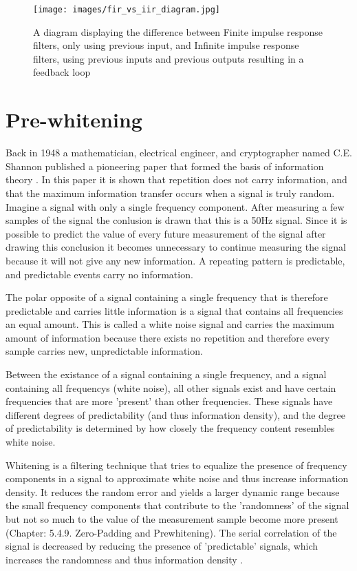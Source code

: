 \begin{figure}[h!t]
	\begin{center}
		\texttt{[image: images/fir\_vs\_iir\_diagram.jpg]}
	\end{center}
	\caption{A diagram displaying the difference between Finite impulse response filters, only using previous input, and Infinite impulse response filters, using previous inputs and previous outputs resulting in a feedback loop \cite{fir_vs_iir_diagram}}
	\label{fig:fir_vs_iir_diagram}
\end{figure}


\section{Pre-whitening}
Back in 1948 a mathematician, electrical engineer, and cryptographer named C.E. Shannon published a pioneering paper that formed the basis of information theory \cite{shannon}. In this paper it is shown that repetition does not carry information, and that the maximum information transfer occurs when a signal is truly random. Imagine a signal with only a single frequency component. After measuring a few samples of the signal the conlusion is drawn that this is a 50Hz signal. Since it is possible to predict the value of every future measurement of the signal after drawing this conclusion it becomes unnecessary to continue measuring the signal because it will not give any new information. A repeating pattern is predictable, and predictable events carry no information.

The polar opposite of a signal containing a single frequency that is therefore predictable and carries little information is a signal that contains all frequencies an equal amount. This is called a white noise signal and carries the maximum amount of information because there exists no repetition and therefore every sample carries new, unpredictable information.

Between the existance of a signal containing a single frequency, and a signal containing all frequencys (white noise), all other signals exist and have certain frequencies that are more 'present' than other frequencies. These signals have different degrees of predictability (and thus information density), and the degree of predictability is determined by how closely the frequency content resembles white noise.

Whitening is a filtering technique that tries to equalize the presence of frequency components in a signal to approximate white noise and thus increase information density. It reduces the random error and yields a larger dynamic range because the small frequency components that contribute to the 'randomness' of the signal but not so much to the value of the measurement sample become more present \cite{time_series_analysis_methods} (Chapter: 5.4.9. Zero-Padding and Prewhitening). The serial correlation of the signal is decreased by reducing the presence of 'predictable' signals, which increases the randomness and thus information density \cite{serial_correlation_definition}. 

